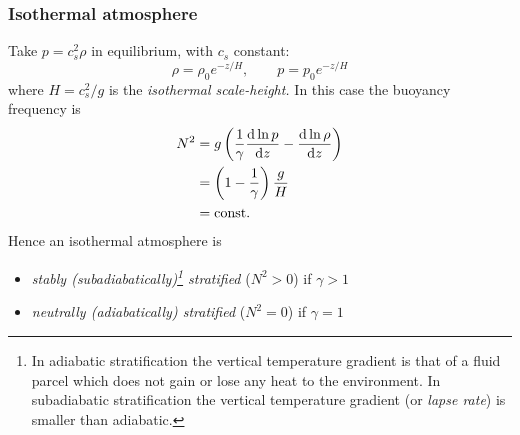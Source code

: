 \documentclass{jknotes}
\begin{document}
\subsubsection{Isothermal atmosphere}
Take $p = c_s^2 \rho$ in equilibrium, with $c_s$ constant:
\begin{equation}
	\rho = \rho_0 e^{-z/H}, \hspace{2em} p = p_0 e^{-z/H}
\end{equation}
where $H = c_s^2/g$ is the \emph{isothermal scale-height.} In this case the
buoyancy frequency is
\begin{align}
	N^2 &= g \left(\frac{1}{\gamma}\frac{\diffd \ln p}{\diffd z} - \frac{\diffd
	\ln \rho}{\diffd z} \right) \\
		&= \left(1-\frac{1}{\gamma}\right) \frac{g}{H} \\
		&= \text{const.}
\end{align}
Hence an isothermal atmosphere is
\begin{itemize}
	\item \emph{stably (subadiabatically)\footnote{
		In adiabatic stratification the vertical temperature gradient is that of a
		fluid parcel which does not gain or lose any heat to the environment.
		In subadiabatic stratification the vertical temperature gradient (or
		\emph{lapse rate}) is smaller than adiabatic.
		} stratified} ($N^2 >
		0$) if $\gamma > 1$
	\item \emph{neutrally (adiabatically) stratified} ($N^2 = 0$) if $\gamma
		= 1$
\end{itemize}
\end{document}
